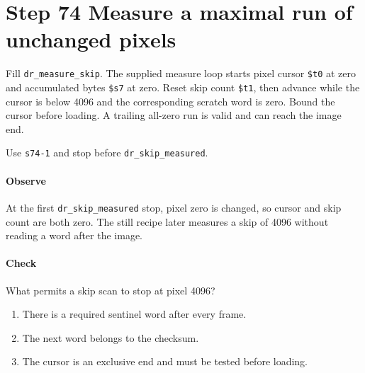 \section{Step 74 Measure a maximal run of unchanged pixels}
Fill \texttt{dr\_measure\_skip}. The supplied measure loop starts pixel cursor \texttt{\$t0} at zero and accumulated bytes \texttt{\$s7} at zero. Reset skip count \texttt{\$t1}, then advance while the cursor is below 4096 and the corresponding scratch word is zero. Bound the cursor before loading. A trailing all-zero run is valid and can reach the image end.

Use \texttt{s74-1} and stop before \texttt{dr\_skip\_measured}.

\paragraph{Observe} At the first \texttt{dr\_skip\_measured} stop, pixel zero is changed, so cursor and skip count are both zero. The still recipe later measures a skip of 4096 without reading a word after the image.

\paragraph{Check} What permits a skip scan to stop at pixel 4096?
\begin{enumerate}[label=\Alph*.]
  \item There is a required sentinel word after every frame.
  \item The next word belongs to the checksum.
  \item The cursor is an exclusive end and must be tested before loading.
\end{enumerate}
